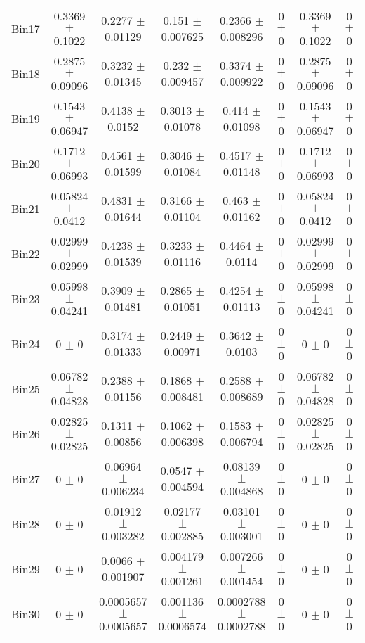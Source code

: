 \begin{tabular}{@{\extracolsep{4pt}}lccccccc@{}}
     Bin17 & 0.3369 $\pm$ 0.1022 & 0.2277 $\pm$ 0.01129 & 0.151 $\pm$ 0.007625 & 0.2366 $\pm$ 0.008296 & 0 $\pm$ 0 & 0.3369 $\pm$ 0.1022 & 0 $\pm$ 0 \\ 
     Bin18 & 0.2875 $\pm$ 0.09096 & 0.3232 $\pm$ 0.01345 & 0.232 $\pm$ 0.009457 & 0.3374 $\pm$ 0.009922 & 0 $\pm$ 0 & 0.2875 $\pm$ 0.09096 & 0 $\pm$ 0 \\ 
     Bin19 & 0.1543 $\pm$ 0.06947 & 0.4138 $\pm$ 0.0152 & 0.3013 $\pm$ 0.01078 & 0.414 $\pm$ 0.01098 & 0 $\pm$ 0 & 0.1543 $\pm$ 0.06947 & 0 $\pm$ 0 \\ 
     Bin20 & 0.1712 $\pm$ 0.06993 & 0.4561 $\pm$ 0.01599 & 0.3046 $\pm$ 0.01084 & 0.4517 $\pm$ 0.01148 & 0 $\pm$ 0 & 0.1712 $\pm$ 0.06993 & 0 $\pm$ 0 \\ 
     Bin21 & 0.05824 $\pm$ 0.0412 & 0.4831 $\pm$ 0.01644 & 0.3166 $\pm$ 0.01104 & 0.463 $\pm$ 0.01162 & 0 $\pm$ 0 & 0.05824 $\pm$ 0.0412 & 0 $\pm$ 0 \\ 
     Bin22 & 0.02999 $\pm$ 0.02999 & 0.4238 $\pm$ 0.01539 & 0.3233 $\pm$ 0.01116 & 0.4464 $\pm$ 0.0114 & 0 $\pm$ 0 & 0.02999 $\pm$ 0.02999 & 0 $\pm$ 0 \\ 
     Bin23 & 0.05998 $\pm$ 0.04241 & 0.3909 $\pm$ 0.01481 & 0.2865 $\pm$ 0.01051 & 0.4254 $\pm$ 0.01113 & 0 $\pm$ 0 & 0.05998 $\pm$ 0.04241 & 0 $\pm$ 0 \\ 
     Bin24 & 0 $\pm$ 0 & 0.3174 $\pm$ 0.01333 & 0.2449 $\pm$ 0.00971 & 0.3642 $\pm$ 0.0103 & 0 $\pm$ 0 & 0 $\pm$ 0 & 0 $\pm$ 0 \\ 
     Bin25 & 0.06782 $\pm$ 0.04828 & 0.2388 $\pm$ 0.01156 & 0.1868 $\pm$ 0.008481 & 0.2588 $\pm$ 0.008689 & 0 $\pm$ 0 & 0.06782 $\pm$ 0.04828 & 0 $\pm$ 0 \\ 
     Bin26 & 0.02825 $\pm$ 0.02825 & 0.1311 $\pm$ 0.00856 & 0.1062 $\pm$ 0.006398 & 0.1583 $\pm$ 0.006794 & 0 $\pm$ 0 & 0.02825 $\pm$ 0.02825 & 0 $\pm$ 0 \\ 
     Bin27 & 0 $\pm$ 0 & 0.06964 $\pm$ 0.006234 & 0.0547 $\pm$ 0.004594 & 0.08139 $\pm$ 0.004868 & 0 $\pm$ 0 & 0 $\pm$ 0 & 0 $\pm$ 0 \\ 
     Bin28 & 0 $\pm$ 0 & 0.01912 $\pm$ 0.003282 & 0.02177 $\pm$ 0.002885 & 0.03101 $\pm$ 0.003001 & 0 $\pm$ 0 & 0 $\pm$ 0 & 0 $\pm$ 0 \\ 
     Bin29 & 0 $\pm$ 0 & 0.0066 $\pm$ 0.001907 & 0.004179 $\pm$ 0.001261 & 0.007266 $\pm$ 0.001454 & 0 $\pm$ 0 & 0 $\pm$ 0 & 0 $\pm$ 0 \\ 
     Bin30 & 0 $\pm$ 0 & 0.0005657 $\pm$ 0.0005657 & 0.001136 $\pm$ 0.0006574 & 0.0002788 $\pm$ 0.0002788 & 0 $\pm$ 0 & 0 $\pm$ 0 & 0 $\pm$ 0 \\ 
\hline\hline
  \end{tabular}
